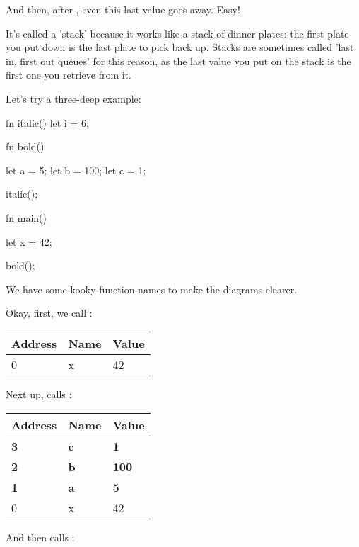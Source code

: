 And then, after , even this last value goes away. Easy!

\blank

It's called a 'stack' because it works like a stack of dinner plates: the first plate you put down is the last plate to pick back up. 
Stacks are sometimes called 'last in, first out queues' for this reason, as the last value you put on the stack is the first one you 
retrieve from it.

\blank

Let's try a three-deep example:

\begin{rustc}
fn italic() {
    let i = 6;
}

fn bold() {
    let a = 5;
    let b = 100;
    let c = 1;

    italic();
}

fn main() {
    let x = 42;

    bold();
}
\end{rustc}

We have some kooky function names to make the diagrams clearer.

\blank

Okay, first, we call :

\begin{table}[H]
  \begin{tabular}{|l|l|l|}
    \hline
    \textbf{Address} & \textbf{Name} & \textbf{Value} \\
    \hline
    0 & x & 42 \\
    \hline
  \end{tabular}
\end{table}

Next up,  calls :

\begin{table}[H]
  \begin{tabular}{|l|l|l|}
    \hline
    \textbf{Address} & \textbf{Name} & \textbf{Value} \\
    \hline
    \textbf{3} & \textbf{c} & \textbf{1} \\
    \hline
    \textbf{2} & \textbf{b} & \textbf{100} \\
    \hline
    \textbf{1} & \textbf{a} & \textbf{5} \\
    \hline
    0 & x & 42 \\
    \hline
  \end{tabular}
\end{table}

And then  calls :

